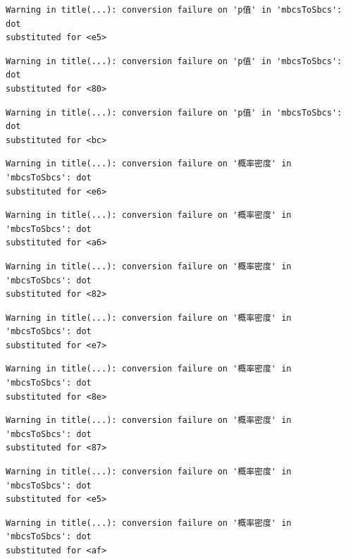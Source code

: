 \documentclass[
  letterpaper,
  DIV=11,
  numbers=noendperiod]{scrreprt}
\begin{document}
\begin{verbatim}
Warning in title(...): conversion failure on 'p值' in 'mbcsToSbcs': dot
substituted for <e5>
\end{verbatim}

\begin{verbatim}
Warning in title(...): conversion failure on 'p值' in 'mbcsToSbcs': dot
substituted for <80>
\end{verbatim}

\begin{verbatim}
Warning in title(...): conversion failure on 'p值' in 'mbcsToSbcs': dot
substituted for <bc>
\end{verbatim}

\begin{verbatim}
Warning in title(...): conversion failure on '概率密度' in 'mbcsToSbcs': dot
substituted for <e6>
\end{verbatim}

\begin{verbatim}
Warning in title(...): conversion failure on '概率密度' in 'mbcsToSbcs': dot
substituted for <a6>
\end{verbatim}

\begin{verbatim}
Warning in title(...): conversion failure on '概率密度' in 'mbcsToSbcs': dot
substituted for <82>
\end{verbatim}

\begin{verbatim}
Warning in title(...): conversion failure on '概率密度' in 'mbcsToSbcs': dot
substituted for <e7>
\end{verbatim}

\begin{verbatim}
Warning in title(...): conversion failure on '概率密度' in 'mbcsToSbcs': dot
substituted for <8e>
\end{verbatim}

\begin{verbatim}
Warning in title(...): conversion failure on '概率密度' in 'mbcsToSbcs': dot
substituted for <87>
\end{verbatim}

\begin{verbatim}
Warning in title(...): conversion failure on '概率密度' in 'mbcsToSbcs': dot
substituted for <e5>
\end{verbatim}

\begin{verbatim}
Warning in title(...): conversion failure on '概率密度' in 'mbcsToSbcs': dot
substituted for <af>
\end{verbatim}
\end{document}
